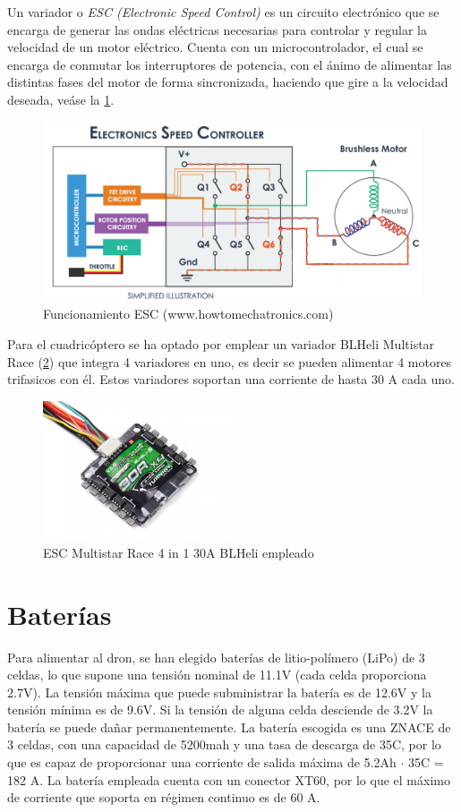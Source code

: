 Un variador o \textit{ESC (Electronic Speed Control)} es un circuito electrónico que se encarga de generar las ondas eléctricas necesarias para controlar y regular la velocidad de un motor eléctrico. Cuenta con un microcontrolador, el cual se encarga de conmutar los interruptores de potencia, con el ánimo de alimentar las distintas fases del motor de forma sincronizada, haciendo que gire a la velocidad deseada, veáse la \cref{hardware:esc_explicacion}.
\begin{figure}[htb!]
	\centering
	\includegraphics[width=0.6\textheight]{hardware/howtomecatronics}
	\caption{Funcionamiento ESC (www.howtomechatronics.com)}
	\label{hardware:esc_explicacion}
\end{figure}

Para el cuadricóptero se ha optado por emplear un variador BLHeli Multistar Race (\cref{hardware:esc}) que integra 4 variadores en uno, es decir se pueden alimentar 4 motores trifasicos con él. Estos variadores soportan una corriente de hasta 30 A cada uno.

\begin{figure}[htb!]
	\centering
	\includegraphics[width=0.5\textwidth]{hardware/esc.jpg}
	\caption{ESC Multistar Race 4 in 1 30A BLHeli empleado}
	\label{hardware:esc}
\end{figure}

\section{Baterías}
Para alimentar al dron, se han elegido baterías de litio-polímero (LiPo) de 3 celdas, lo que supone una tensión nominal de 11.1V (cada celda proporciona 2.7V). La tensión máxima que puede subministrar la batería es de 12.6V y la tensión mínima es de 9.6V. Si la tensión de alguna celda desciende de 3.2V la batería se puede dañar permanentemente. La batería escogida es una ZNACE de 3 celdas, con una capacidad de 5200mah y una tasa de descarga de 35C, por lo que es capaz de proporcionar una corriente de salida máxima de 5.2Ah $\cdot$ 35C = 182 A. La batería empleada cuenta con un conector XT60, por lo que el máximo de corriente que soporta en régimen continuo es de 60 A.

